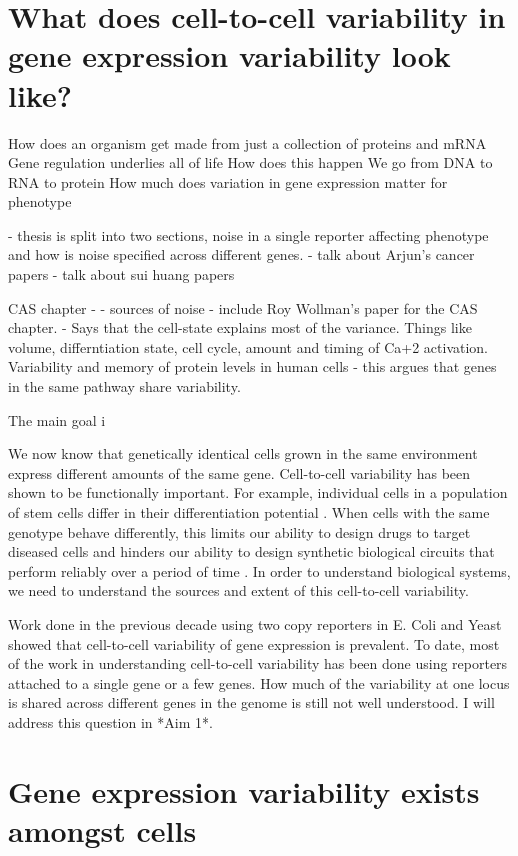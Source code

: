 \section {What does cell-to-cell variability in gene expression variability look like?}

How does an organism get made from just a collection of proteins and mRNA
Gene regulation underlies all of life
How does this happen
We go from DNA to RNA to protein
How much does variation in gene expression matter for phenotype

- thesis is split into two sections, noise in a single reporter affecting phenotype and how is noise specified across different genes.
- talk about Arjun's cancer papers
- talk about sui huang papers


CAS chapter - - sources of noise
- include Roy Wollman's paper for the CAS chapter. 
    - Says that the cell-state explains most of the variance. Things like volume, differntiation state, cell cycle, amount and timing of Ca+2 activation.
Variability and memory of protein levels in human cells - this argues that genes in the same pathway share variability.


The main goal i     

We now know that genetically identical cells grown in the same environment express different amounts of the same gene. Cell-to-cell variability has been shown to be functionally important. For example, individual cells in a population of stem cells differ in their differentiation potential \cite{chang_transcriptome-wide_2008}. When cells with the same genotype behave differently, this limits our ability to design drugs to target diseased cells and hinders our ability to design synthetic biological circuits that perform reliably over a period of time \cite{elowitz_synthetic_2000}. In order to understand biological systems, we need to understand the sources and extent of this cell-to-cell variability.

Work done in the previous decade using two copy reporters in E. Coli \cite{elowitz_stochastic_2002} and Yeast \cite{raser_control_2004} showed that cell-to-cell variability of gene expression is prevalent. To date, most of the work in understanding cell-to-cell variability has been done using reporters attached to a single gene or a few genes. How much of the variability at one locus is shared across different genes in the genome is still not well understood. I will address this question in *Aim 1*.


\section{Gene expression variability exists amongst cells}

